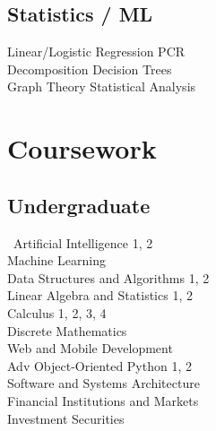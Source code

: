 \documentclass[]{two-column}
\begin{document}
\begin{minipage}[t]{0.33\textwidth}
\subsection{Statistics / ML}
\vspace{1pt}
Linear/Logistic Regression \textbullet{} PCR\\
Decomposition \textbullet{} Decision Trees\\
Graph Theory \textbullet{} Statistical Analysis\\

\sectionsep


\section{Coursework}
\vspace{1pt}
\subsection{Undergraduate}
\vspace{3pt}\
Artificial Intelligence 1, 2\\
Machine Learning\\
Data Structures and Algorithms 1, 2\\
Linear Algebra and Statistics 1, 2\\
Calculus 1, 2, 3, 4 \\
Discrete Mathematics \\
Web and Mobile Development\\
Adv Object-Oriented Python 1, 2 \\
Software and Systems Architecture \\
Financial Institutions and Markets \\
Investment Securities\\
\sectionsep


%
%

\end{minipage} 
\hfill
\end{document}
